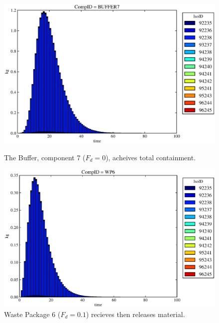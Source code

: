 \begin{figure}[ht]
\begin{minipage}[b]{0.45\linewidth}
  \includegraphics[width=\textwidth]{./chapters/demonstration/base/mcIII3.eps}
  \caption[Case MCI Buffer Contaminants]{
    The Buffer, component 7 ($F_d=0$), acheives total containment.
    }
  \label{fig:mcIIIbuff}

\end{minipage}
\hspace{0.05\linewidth}
\begin{minipage}[b]{0.45\linewidth}
  \includegraphics[width=\textwidth]{./chapters/demonstration/base/mcIII2.eps}
  \caption[Case MCI Waste Package Contaminants.]{ 
    Waste Package 6 ($F_d = 0.1$) recieves then releases material. 
    }
  \label{fig:mcIIIwp6}


\end{minipage}
\end{figure}
